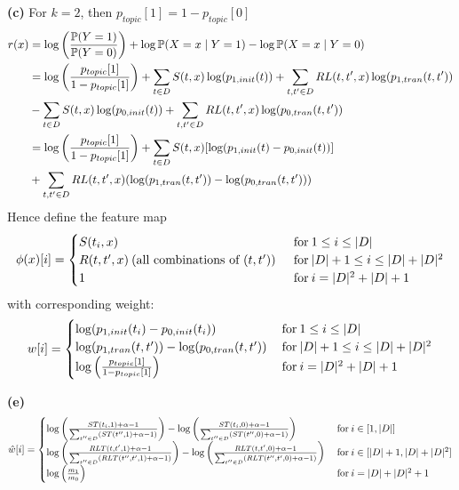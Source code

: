 \documentclass[a4paper, 11pt]{article}
\begin{document}
\begin{problem}
\textbf{(c)} For $k = 2$, then $p_{topic}[1] = 1 - p_{topic}[0]$
\begin{align*}
    r(x) &= \log \left(\frac{\mathbb{P}(Y = 1)}{\mathbb{P}(Y = 0)}\right) + \log \mathbb{P}(X = x \mid Y = 1) - \log \mathbb{P}(X = x \mid Y = 0) \\
    &= \log \left(\frac{p_{topic}[1]}{1 - p_{topic}[1]}\right) + \sum_{t \in D} S(t, x) \log (p_{1, init}(t)) + \sum_{t, t' \in D} RL(t, t', x) \log(p_{1, tran}(t, t'))\\
    &- \sum_{t \in D} S(t, x) \log (p_{0, init}(t)) + \sum_{t, t' \in D} RL(t, t', x) \log(p_{0, tran}(t, t')) \\
    &= \log \left(\frac{p_{topic}[1]}{1 - p_{topic}[1]}\right) + \sum_{t \in D} S(t, x) [\log(p_{1, init}(t) - p_{0, init}(t))] \\
    &+ \sum_{t, t' \in D} RL(t, t', x) (\log (p_{1, tran}(t, t') ) - \log(p_{0, tran}(t, t')))
\end{align*}
Hence define the feature map
\begin{equation*}
    \phi(x)[i] =  
    \begin{cases}
        S(t_i, x) & \:\text{for}\: 1 \leq i \leq \lvert D\rvert \\
        R(t, t', x) \:\text{(all combinations of $(t, t')$)}\: & \:\text{for}\: \lvert D\rvert + 1 \leq i \leq \lvert D\rvert + \lvert D\rvert^2 \\
        1 & \:\text{for}\: i = \lvert D\rvert^2 + \lvert D\rvert + 1
    \end{cases}
\end{equation*}
with corresponding weight:
\begin{equation*}
w[i] = \begin{cases}
    \log(p_{1, init}(t_i) - p_{0, init}(t_i)) & \:\text{for}\:  1 \leq i \leq \lvert D\rvert \\
    \log (p_{1, tran}(t, t') ) - \log(p_{0, tran}(t, t')) & \:\text{for}\: \lvert D\rvert + 1 \leq i \leq \lvert D\rvert + \lvert D\rvert^2 \\
    \log \left(\frac{p_{topic}[1]}{1 - p_{topic}[1]}\right) & \:\text{for}\:  i  = \lvert D\rvert^2 + \lvert D\rvert + 1
\end{cases}
\end{equation*}

\textbf{(e)} \begin{equation*}
\hat{w}[i] = \begin{cases}
    \log\left(\frac{ST(t_i, 1) + \alpha - 1}{\sum_{t'' \in D} (ST(t'', 1) + \alpha - 1)}\right) - \log\left(\frac{ST(t_i, 0) + \alpha - 1}{\sum_{t'' \in D} (ST(t'', 0) + \alpha - 1)}\right) &\:\text{for}\: i \in [1, \lvert D\rvert] \\
    \log\left(\frac{RLT(t, t', 1) + \alpha -1 }{\sum_{t'' \in D} (RLT(t'', t', 1) + \alpha -1) }\right)- \log\left(\frac{RLT(t, t', 0) + \alpha -1 }{\sum_{t'' \in D} (RLT(t'', t', 0) + \alpha -1) }\right) &\:\text{for}\: i \in [\lvert D\rvert + 1, \lvert D\rvert + \lvert D\rvert^2] \\
    \log\left(\frac{m_1}{m_0}\right) & \:\text{for}\: i = \lvert D\rvert + \lvert D\rvert^2 + 1
\end{cases}
\end{equation*}
\end{problem}
\end{document}
